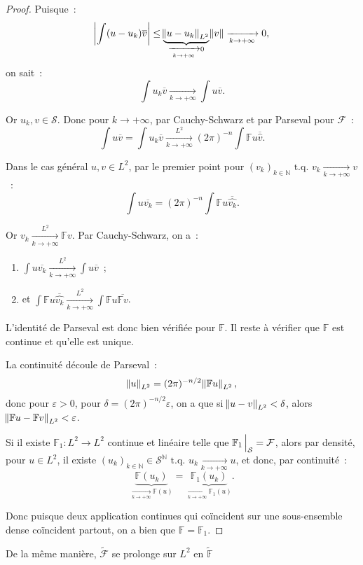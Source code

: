 \documentclass{report}
\newcommand{\N}{{\mathbb N}}
\newcommand{\tq}{\text{ t.q. }}
\newcommand{\pinfty}{{+\infty}}
\theoremstyle{definition}
\theoremstyle{remark}
\begin{document}
\begin{proof}
Puisque~:
\[\abs {\int (u-u_k)\overline v} \leq \underbrace {\norm {u-u_k}_{L^2}}_{\xrightarrow[k \to \pinfty]{} 0} \norm v \xrightarrow[k \to \pinfty]{} 0,\]
on sait~:
\[\int u_k\overline v \xrightarrow[k \to \pinfty]{} \int u\overline v.\]

Or $u_k, v \in \mathcal S$. Donc pour $k \to \pinfty$, par Cauchy-Schwarz et par Parseval pour $\mathcal F$~:
\[\int u\overline v = \int u_k\overline v \xrightarrow[k \to \pinfty]{L^2} (2\pi)^{-n}\int\mathbb Fu\overline {\hat v}.\]

Dans le cas général $u, v \in L^2$, par le premier point pour $(v_k)_{k \in \N} \tq v_k \xrightarrow[k \to \pinfty]{} v$~:
\[\int u\overline {v_k} = (2\pi)^{-n}\int \mathbb Fu\overline {\hat {v_k}}.\]

Or $v_k \xrightarrow[k \to \pinfty]{L^2} \mathbb Fv$. Par Cauchy-Schwarz, on a~:
\begin{enumerate}
	\item $\int u\overline {v_k} \xrightarrow[k \to \pinfty]{L^2} \int u\overline v$~;
	\item et $\int \mathbb Fu\overline {\hat {v_k}} \xrightarrow[k \to \pinfty]{L^2} \int \mathbb Fu\overline {\mathbb Fv}$.
\end{enumerate}

L'identité de Parseval est donc bien vérifiée pour $\mathbb F$. Il reste à vérifier que $\mathbb F$ est continue et qu'elle est unique.

La continuité découle de Parseval~:
\[\norm u_{L^2} = (2\pi)^{-n/2}\norm {\mathbb Fu}_{L^2},\]
donc pour $\varepsilon > 0$, pour $\delta = (2\pi)^{-n/2}\varepsilon$, on a que si $\norm {u-v}_{L^2} < \delta$, alors $\norm {\mathbb Fu - \mathbb Fv}_{L^2} < \varepsilon$.

Si il existe $\mathbb F_1 : L^2 \to L^2$ continue et linéaire telle que $\mathbb F_1\sVert[2]_{\mathcal S} = \mathcal F$, alors par densité, pour $u \in L^2$, il existe
$(u_k)_{k \in \N} \in \mathcal S^\N \tq u_k \xrightarrow[k \to \pinfty]{} u$, et donc, par continuité~:
\[\underbrace {\mathbb F(u_k)}_{\xrightarrow[k \to \pinfty]{} \mathbb F(u)} = \underbrace {\mathbb F_1(u_k)}_{\xrightarrow[k \to \pinfty]{} \mathbb F_1(u)}.\]

Donc puisque deux application continues qui coïncident sur une sous-ensemble dense coïncident partout, on a bien que $\mathbb F = \mathbb F_1$.
\end{proof}

De la même manière, $\tilde {\mathcal F}$ se prolonge sur $L^2$ en $\tilde {\mathbb F}$
\end{document}
